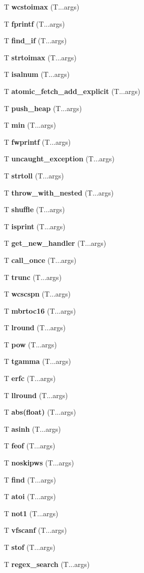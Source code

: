 \begin{DoxyCompactItemize}
T {\bf wcstoimax} (T...\+args)
\item 
T {\bf fprintf} (T...\+args)
\item 
T {\bf find\+\_\+if} (T...\+args)
\item 
T {\bf strtoimax} (T...\+args)
\item 
T {\bf isalnum} (T...\+args)
\item 
T {\bf atomic\+\_\+fetch\+\_\+add\+\_\+explicit} (T...\+args)
\item 
T {\bf push\+\_\+heap} (T...\+args)
\item 
T {\bf min} (T...\+args)
\item 
T {\bf fwprintf} (T...\+args)
\item 
T {\bf uncaught\+\_\+exception} (T...\+args)
\item 
T {\bf strtoll} (T...\+args)
\item 
T {\bf throw\+\_\+with\+\_\+nested} (T...\+args)
\item 
T {\bf shuffle} (T...\+args)
\item 
T {\bf isprint} (T...\+args)
\item 
T {\bf get\+\_\+new\+\_\+handler} (T...\+args)
\item 
T {\bf call\+\_\+once} (T...\+args)
\item 
T {\bf trunc} (T...\+args)
\item 
T {\bf wcscspn} (T...\+args)
\item 
T {\bf mbrtoc16} (T...\+args)
\item 
T {\bf lround} (T...\+args)
\item 
T {\bf pow} (T...\+args)
\item 
T {\bf tgamma} (T...\+args)
\item 
T {\bf erfc} (T...\+args)
\item 
T {\bf llround} (T...\+args)
\item 
T {\bf abs(float)} (T...\+args)
\item 
T {\bf asinh} (T...\+args)
\item 
T {\bf feof} (T...\+args)
\item 
T {\bf noskipws} (T...\+args)
\item 
T {\bf find} (T...\+args)
\item 
T {\bf atoi} (T...\+args)
\item 
T {\bf not1} (T...\+args)
\item 
T {\bf vfscanf} (T...\+args)
\item 
T {\bf stof} (T...\+args)
\item 
T {\bf regex\+\_\+search} (T...\+args)

\end{DoxyCompactItemize}
